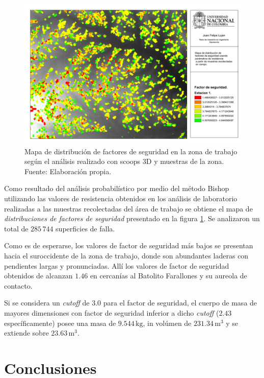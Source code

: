 \begin{figure}[H]
\centering
\includegraphics[scale=0.3]{img/fos3DCampo.pdf}
\caption{Mapa de distribución de factores de seguridad en la zona de trabajo según el análisis realizado con scoops 3D y muestras de la zona. Fuente: Elaboración propia.}
\label{fig:fos3dout}
\end{figure}

Como resultado del an\'alisis probabil\'istico por medio del m\'etodo Bishop utilizando las valores de resistencia obtenidos en los an\'alisis de laboratorio realizadas a las muestras recolectadas del \'area de trabajo se obtiene el mapa de \emph{distribuciones de factores de seguridad} presentado en la figura \ref{fig:fos3dout}.
Se analizaron un total de \(285\,744\) superficies de falla.

Como es de esperarse, los valores de factor de seguridad m\'as bajos se presentan hacia el suroccidente de la zona de trabajo, donde  son abundantes laderas con pendientes  largas y pronunciadas. All\'i los valores de factor de seguridad obtenidos de alcanzan \(1.46\) en cercan\'ias al Batolito Farallones y su aureola de contacto.

Si se considera un \textit{cutoff} de 3.0 para el factor de seguridad, el cuerpo de masa de mayores dimensiones con factor de seguridad  inferior a dicho \textit{cutoff} ($2.43$ espec\'ificamente) posee una masa de $9.544\,\text{kg}$, in vol\'umen de $231.34\,\text{m$^{3}$}$ y se extiende sobre $23.63\,\text{m$^{3}$}$.



\section{Conclusiones}


